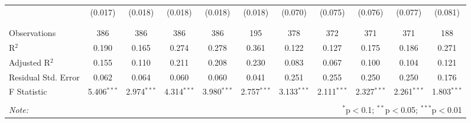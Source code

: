\begin{table}[H]
\begin{tabular}{@{\extracolsep{4pt}}lcccccccccc}
  & (0.017) & (0.018) & (0.018) & (0.018) & (0.018) & (0.070) & (0.075) & (0.076) & (0.077) & (0.081) \\ 
  & & & & & & & & & & \\ 
\hline \\[-1.8ex] 
Observations & 386 & 386 & 386 & 386 & 195 & 378 & 372 & 371 & 371 & 188 \\ 
R$^{2}$ & 0.190 & 0.165 & 0.274 & 0.278 & 0.361 & 0.122 & 0.127 & 0.175 & 0.186 & 0.271 \\ 
Adjusted R$^{2}$ & 0.155 & 0.110 & 0.211 & 0.208 & 0.230 & 0.083 & 0.067 & 0.100 & 0.104 & 0.121 \\ 
Residual Std. Error & 0.062 & 0.064 & 0.060 & 0.060 & 0.041 & 0.251 & 0.255 & 0.250 & 0.250 & 0.176 \\ 
F Statistic & 5.406$^{***}$ & 2.974$^{***}$ & 4.314$^{***}$ & 3.980$^{***}$ & 2.757$^{***}$ & 3.133$^{***}$ & 2.111$^{***}$ & 2.327$^{***}$ & 2.261$^{***}$ & 1.803$^{***}$ \\ 
\hline 
\hline \\[-1.8ex] 
\textit{Note:}  & \multicolumn{10}{r}{$^{*}$p$<$0.1; $^{**}$p$<$0.05; $^{***}$p$<$0.01} \\ 
\end{tabular} 
\end{table} 
